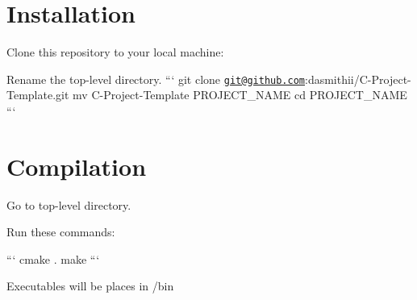 \section*{Installation }


\begin{DoxyItemize}
\item Clone this repository to your local machine\+:
\item Rename the top-\/level directory. ``` git clone \href{mailto:git@github.com}{\tt git@github.\+com}\+:dasmithii/\+C-\/\+Project-\/\+Template.\+git mv C-\/\+Project-\/\+Template P\+R\+O\+J\+E\+C\+T\+\_\+\+N\+A\+M\+E cd P\+R\+O\+J\+E\+C\+T\+\_\+\+N\+A\+M\+E ```
\end{DoxyItemize}

\section*{Compilation }


\begin{DoxyItemize}
\item Go to top-\/level directory.
\item Run these commands\+:
\end{DoxyItemize}

``` cmake . make ```
\begin{DoxyItemize}
\item Executables will be places in /bin 
\end{DoxyItemize}